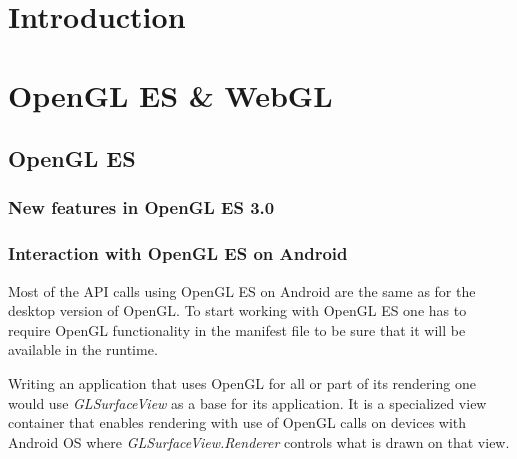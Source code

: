 \documentclass[a4paper,11pt]{article}
\begin{document}



\section{Introduction} 



\pagebreak[3]
\section{OpenGL ES \& WebGL}


\pagebreak[3] 
\subsection{OpenGL ES}

\subsubsection{New features in OpenGL ES 3.0}


\subsubsection{Interaction with OpenGL ES on Android}
Most of the API calls using OpenGL ES on Android are the same as for the desktop version of OpenGL. 
To start working with OpenGL ES one has to require OpenGL functionality in the manifest file to be sure that it will be available in the runtime.



Writing an application that uses OpenGL for all or part of its rendering one would use \emph{GLSurfaceView} \cite{android_glsurfaceview} as a base for its application.
It is a specialized view container that enables rendering with use of OpenGL calls on devices with Android OS where \emph{GLSurfaceView.Renderer} controls what is drawn on that view.
\end{document}
